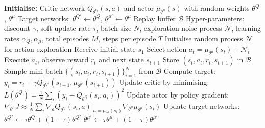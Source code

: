 \begin{algorithmic}
\State \textbf{Initialise:}
\State \quad Critic network $Q_{\theta^Q}(s, a)$ and actor $\mu_{\theta^\mu}(s)$ with random weights $\theta^Q$, $\theta^\mu$
\State \quad Target networks: $\theta^{Q'} \leftarrow \theta^Q$, $\theta^{\mu'} \leftarrow \theta^\mu$
\State \quad Replay buffer $\mathcal{B}$
\State \quad Hyper-parameters: discount $\gamma$, soft update rate $\tau$, batch size $N$, exploration noise process $\mathcal{N}$, learning rates $\alpha_Q, \alpha_\mu$, total episodes $M$, steps per episode $T$
    \State Initialise random process $\mathcal{N}$ for action exploration
    \State Receive initial state $s_1$
        \State Select action $a_t = \mu_{\theta^\mu}(s_t) + \mathcal{N}_t$
        \State Execute $a_t$, observe reward $r_t$ and next state $s_{t+1}$
        \State Store $(s_t, a_t, r_t, s_{t+1})$ in $\mathcal{B}$
        \State Sample mini-batch $\{(s_i, a_i, r_i, s_{i+1})\}_{i=1}^N$ from $\mathcal{B}$
        \State Compute target: $y_i = r_i + \gamma Q_{\theta^{Q'}}(s_{i+1}, \mu_{\theta^{\mu'}}(s_{i+1}))$
        \State Update critic by minimising: $L(\theta^Q) = \frac{1}{N}\sum_i (y_i - Q_{\theta^Q}(s_i, a_i))^2$
        \State Update actor by policy gradient:
        \State \quad $\nabla_{\theta^\mu} J \approx \frac{1}{N}\sum_i \nabla_a Q_{\theta^Q}(s_i, a)|_{a=\mu_{\theta^\mu}(s_i)} \nabla_{\theta^\mu}\mu_{\theta^\mu}(s_i)$
        \State Update target networks:
        \State \quad $\theta^{Q'} \leftarrow \tau \theta^Q + (1 - \tau)\theta^{Q'}$
        \State \quad $\theta^{\mu'} \leftarrow \tau \theta^\mu + (1 - \tau)\theta^{\mu'}$
    \EndFor
\EndFor
\end{algorithmic}